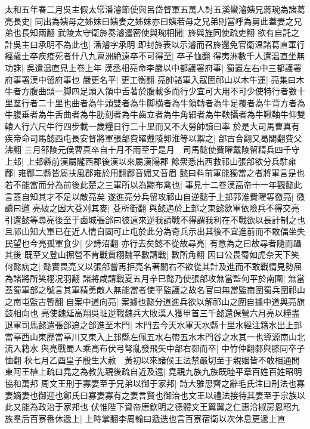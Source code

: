 太和五年春二月吳主假太常潘濬節使與呂岱督軍五萬人討五溪蠻濬姨兄蔣琬為諸葛亮長史|{
	同出為姨母之姊妹曰姨妻之姊妹亦曰姨若母之兄弟則當呼為舅此蓋妻之兄弟也長知兩翻}
武陵太守衛旍奏濬遣密使與琬相聞|{
	旍與旌同使疏吏翻}
欲有自託之計吳主曰承明不為此也|{
	潘濬字承明}
即封旍表以示濬而召旍還免官衛温諸葛直軍行經歲士卒疾疫死者什八九亶洲絶遠卒不可得至|{
	卒子恤翻}
得夷洲數千人還温直坐無功誅|{
	吳遣温直見上卷上年}
漢丞相亮命李嚴以中都護署府事|{
	蜀置左右中三都護署府事署漢中留府事也}
嚴更名平|{
	更工衡翻}
亮帥諸軍入寇圍祁山以木牛運|{
	亮集曰木牛者方腹曲頭一脚四足頭入領中舌著於腹載多而行少宜可大用不可少使特行者數十里羣行者二十里也曲者為牛頭雙者為牛脚横者為牛領轉者為牛足覆者為牛背方者為牛腹垂者為牛舌曲者為牛肋刻者為牛齒立者為牛角細者為牛鞅攝者為牛鞦䩜牛仰雙轅人行六尺牛行四步載一歲糧日行二十里而又不大勞帥讀曰率}
於是大司馬曹真有疾帝命司馬懿西屯長安督將軍張郃費曜戴陵郭淮等以禦之|{
	郃古合翻又曷閣翻費父沸翻}
三月邵陵元侯曹真卒自十月不雨至于是月　司馬懿使費曜戴陵留精兵四千守上邽|{
	上邽縣前漢屬隴西郡後漢以來屬漢陽郡}
餘衆悉出西救祁山張郃欲分兵駐雍郿|{
	雍郿二縣皆屬扶風郡雍於用翻郿音媚又音眉}
懿曰料前軍能獨當之者將軍言是也若不能當而分為前後此楚之三軍所以為黥布禽也|{
	事見十二卷漢高帝十一年觀懿此言蓋自知其才不足以敵亮矣}
遂進亮分兵留攻祁山自逆懿于上邽郭淮費曜等徼亮|{
	徼讀曰邀}
亮破之因大芟刈其麥|{
	芟所衘翻}
與懿遇於上邽之東懿歛軍依險兵不得交亮引還懿等尋亮後至于鹵城張郃曰彼遠來逆我請戰不得謂我利在不戰欲以長計制之也且祁山知大軍已在近人情自固可止屯於此分為奇兵示出其後不宜進前而不敢偪坐失民望也今亮孤軍食少|{
	少詩沼翻}
亦行去矣懿不從故尋亮|{
	有意為之曰故尋者隨而躡其後}
既至又登山掘營不肯戰賈栩魏平數請戰|{
	數所角翻}
因曰公畏蜀如虎奈天下笑何懿病之|{
	懿實畏亮又以張郃嘗再拒亮名著關右不欲從其計及進而不敢戰情見勢屈為諸將所笑栩况羽翻}
諸將咸請戰夏五月辛巳懿乃使張郃攻無當監何平於南圍|{
	無當蓋蜀軍部之號言其軍精勇敵人無能當者使平監護之故名官曰無當監南圍蜀兵圍祁山之南屯監古暫翻}
自案中道向亮|{
	案據也懿分道進兵欲以解祁山之圍自據中道與亮旗鼓相向也}
亮使魏延高翔吳班逆戰魏兵大敗漢人獲甲首三千懿還保營六月亮以糧盡退軍司馬懿遣張郃追之郃進至木門|{
	木門去今天水軍天水縣十里水經注籍水出上邽當亭西山東歷當亭川又東入上邽縣左佩五水右帶五水木門谷之水其一也導源南山北流入籍水}
與亮戰蜀人乘高布伏弓弩亂發飛矢中郃右䣛而卒|{
	中竹仲翻䣛與膝同卒子恤翻}
秋七月乙酉皇子殷生大赦　黃初以來諸侯王法禁嚴切至于親姻皆不敢相通問東阿王植上疏曰堯之為教先親後疏自近及遠|{
	堯親九族九族既睦平章百姓百姓昭明協和萬邦}
周文王刑于寡妻至于兄弟以御于家邦|{
	詩大雅思齊之辭毛氏注曰刑法也寡妻嫡妻也御迎也鄭氏曰寡妻寡有之妻言賢也御治也文王以禮法接待其妻至于宗族以此又能為政治于家邦也}
伏惟陛下資帝唐欽明之德體文王翼翼之仁惠洽椒房恩昭九族羣后百寮番休遞上|{
	上時掌翻李周翰曰遞迭也言百寮宿衛以次休息更遞上直}
